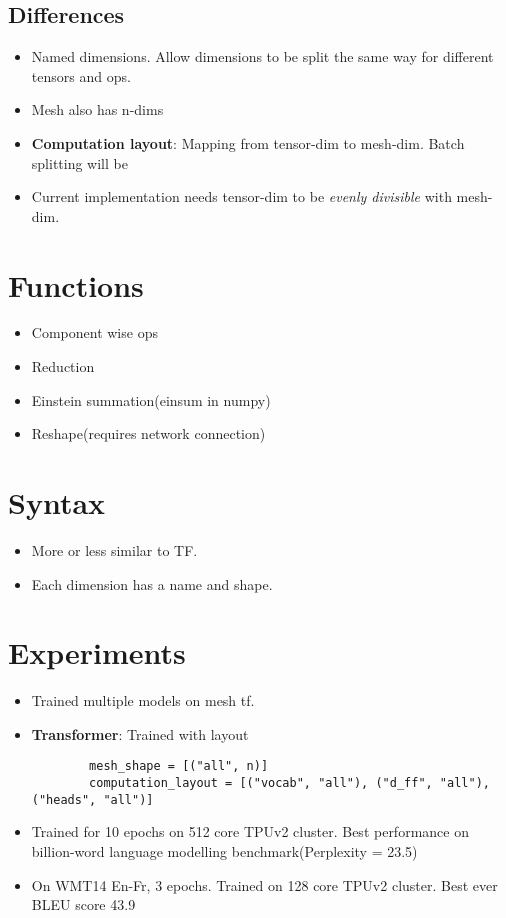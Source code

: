 \documentclass[a4paper]{article}
\begin{document}
\subsection{Differences}
\begin{itemize}
    \item Named dimensions. Allow dimensions to be split the same way for different tensors and ops.
    \item Mesh also has n-dims
    \item \textbf{Computation layout}: Mapping from tensor-dim to mesh-dim. Batch splitting will be 
    \item Current implementation needs tensor-dim to be \textit{evenly divisible} with mesh-dim.
\end{itemize}
\section{Functions}
\begin{itemize}
    \item Component wise ops
    \item Reduction
    \item Einstein summation(einsum in numpy)
    \item Reshape(requires network connection)
\end{itemize}
\section{Syntax}
\begin{itemize}
    \item More or less similar to TF.
    \item Each dimension has a name and shape.
\end{itemize}
\section{Experiments}
\begin{itemize}
    \item Trained multiple models on mesh tf.
    \item \textbf{Transformer}: Trained with layout
    \begin{verbatim}
        mesh_shape = [("all", n)]
        computation_layout = [("vocab", "all"), ("d_ff", "all"), ("heads", "all")]
    \end{verbatim}
    \item Trained for 10 epochs on 512 core TPUv2 cluster. Best performance on billion-word language modelling benchmark(Perplexity = 23.5)
    \item On WMT14 En-Fr, 3 epochs. Trained on 128 core TPUv2 cluster. Best ever BLEU score 43.9
\end{itemize}
\end{document}
